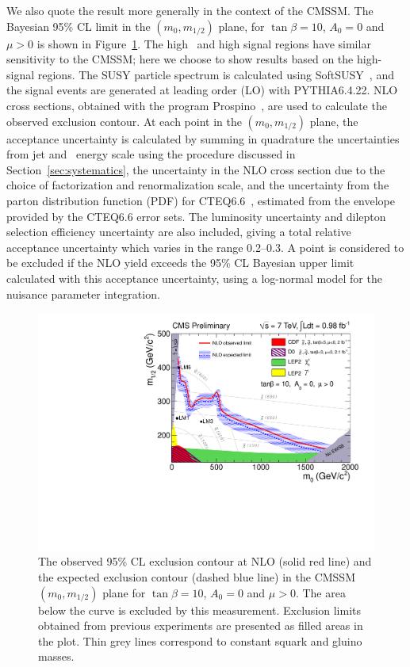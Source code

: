 We also quote the result more generally in the context of the CMSSM.
The Bayesian 95\% CL limit  in the  $(m_0,m_{1/2})$ plane,  for $\tan\beta=10$,
$A_0 = 0$ and $\mu > 0$ is shown in Figure~\ref{fig:msugra}. 
The high \met\ and high \Ht signal regions have similar sensitivity to the CMSSM; 
here we choose to show results based on the high-\Ht signal regions. The
SUSY particle  spectrum is calculated using  SoftSUSY~\cite{Allanach:2002uq}, and the
signal  events  are  generated  at  leading  order  (LO)  with  PYTHIA6.4.22.
NLO  cross sections,  obtained  with the
program  Prospino~\cite{Beenakker:1997kx},  are used  to  calculate  the observed
exclusion  contour.  
At each point in the  $(m_0,m_{1/2})$ plane, the acceptance uncertainty is calculated by
summing in quadrature the uncertainties from jet and \met\ energy scale using the
procedure discussed in Section~\ref{sec:systematics}, the uncertainty in the 
NLO cross section due to the choice of factorization and renormalization scale, 
and the uncertainty from the parton distribution function (PDF) for CTEQ6.6~\cite{Nadolsky:2008fk},
estimated from  the  envelope  provided  by  the  CTEQ6.6  error sets.
The luminosity uncertainty and dilepton
selection efficiency uncertainty are also included, giving a total relative acceptance uncertainty which varies
in the range 0.2--0.3.
A point is considered to be excluded if the NLO yield exceeds the 95\% CL
Bayesian upper limit calculated with this acceptance uncertainty, using
a log-normal model for the nuisance parameter integration.

\begin{figure}[tbh]
\begin{center}
\includegraphics[width=1\linewidth]{plots/RA6_ExclusionLimit_tanb10.pdf}
\caption{\label{fig:msugra}\protect 
The observed 95\% CL exclusion contour at NLO (solid red line) and the expected exclusion contour (dashed blue line) 
in the CMSSM $(m_0,m_{1/2})$ plane for  $\tan\beta=10$, $A_0 = 0$ and $\mu > 0$. 
The area below the curve is excluded by this measurement. Exclusion limits obtained from 
previous experiments are presented as filled areas in the plot. Thin grey lines correspond to 
constant squark and gluino masses.}
\end{center}
\end{figure}

